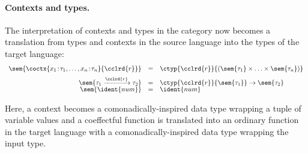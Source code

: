 \paragraph{Contexts and types.}
The interpretation of contexts and types in the category now becomes a translation from types and
contexts in the source language into the types of the target language:
%
\begin{equation*}
\begin{array}{rcl}
\sem{\coctx{x_1\!:\!\tau_1, \ldots, x_n\!:\!\tau_n}{\cclrd{r}}} &=& \ctyp{\cclrd{r}}{(\sem{\tau_1} \times \ldots \times \sem{\tau_n})} \\[0.5em]
\sem{\tau_1 \xrightarrow{\cclrd{r}} \tau_2} & = & \ctyp{\cclrd{r}}{\sem{\tau_1}} \rightarrow \sem{\tau_2} \\[-0.2em]
\sem{\ident{num}} & = & \ident{num} \\
\end{array}
\end{equation*}

\noindent
Here, a context becomes a comonadically-inspired data type wrapping a tuple of variable values
and a coeffectful function is translated into an ordinary function in the target language
with a comonadically-inspired data type wrapping the input type.


